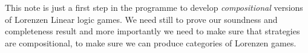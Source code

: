 \documentclass{article}
\begin{document}
 This note is just a first step in the programme to develop {\em
   compositional} versions of Lorenzen Linear logic games. We need
 still to prove our soundness and completeness result and more
 importantly we need to make sure that strategies are compositional,
 to make sure we can produce categories of Lorenzen games.
















\end{document}
